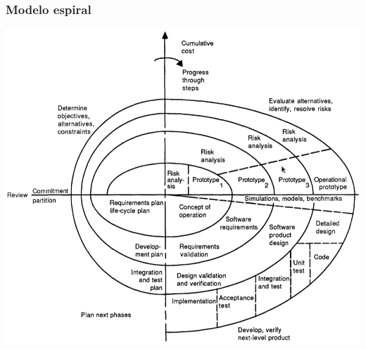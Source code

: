\begin{frame}[hasnext=true, hasprev=true]
	\frametitle{Modelo espiral}

	\begin{block:fact}{}
		\centering
		\includegraphics[width=.8\textwidth]{software-engineering/project-management/process/sdlc/spiral/spiral}
	\end{block:fact}
	
\end{frame}


